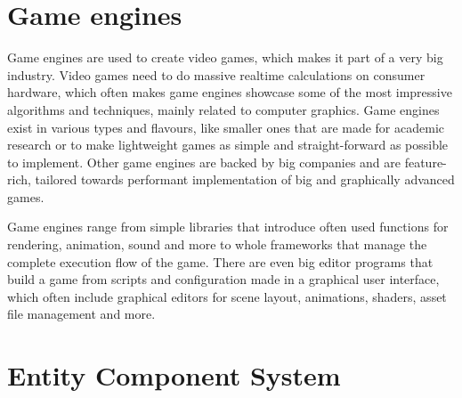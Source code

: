 
\section*{Game engines}

Game engines are used to create video games, which makes it part of a very big industry. Video games need to do massive realtime calculations on consumer hardware, which often makes game engines showcase some of the most impressive algorithms and techniques, mainly related to computer graphics. Game engines exist in various types and flavours, like smaller ones that are made for academic research or to make lightweight games as simple and straight-forward as possible to implement. Other game engines are backed by big companies and are feature-rich, tailored towards performant implementation of big and graphically advanced games.

Game engines range from simple libraries that introduce often used functions for rendering, animation, sound and more to whole frameworks that manage the complete execution flow of the game. There are even big editor programs that build a game from scripts and configuration made in a graphical user interface, which often include graphical editors for scene layout, animations, shaders, asset file management and more.

\section*{Entity Component System}

